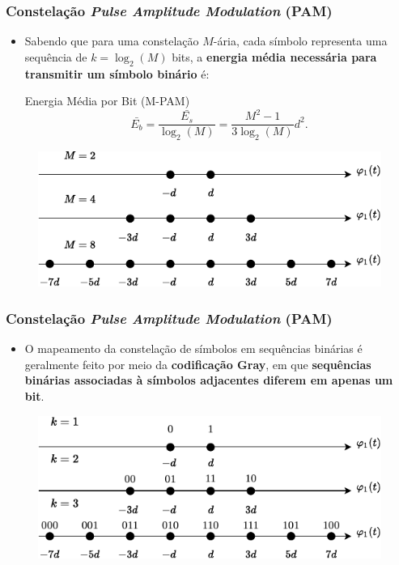 \documentclass{beamer}
\newcommand{\pag}[1] {\begin{frame}#1\end{frame}}
\begin{document}
\pag{
	\frametitle{Constelação \textit{Pulse Amplitude Modulation} (PAM)}
	\begin{itemize}
		\item Sabendo que para uma constelação $M$-ária, cada símbolo representa uma sequência de $k = \log_{2}(M)$ bits, a \textbf{energia média necessária para transmitir um símbolo binário} é:
	\begin{block}{Energia Média por Bit (M-PAM)}
		\begin{equation}
			\bar{E_{b}} = \frac{\bar{E_{s}}}{\log_{2}(M)} = \frac{M^2 - 1}{3\log_{2}(M)}d^2.
		\end{equation}
	\end{block}
	\end{itemize}		
	\begin{figure}[!htb]
		\centering
		\includegraphics[width=0.8\linewidth]{PAM_C1.pdf}
	\end{figure}	
}

\pag{
	\frametitle{Constelação \textit{Pulse Amplitude Modulation} (PAM)}
	\begin{itemize}
		\item O mapeamento da constelação de símbolos em sequências binárias é geralmente feito por meio da \textbf{codificação Gray}, em que \textbf{sequências binárias associadas à símbolos adjacentes diferem em apenas um bit}.
	\end{itemize}
	\begin{figure}[!htb]
		\centering
		\includegraphics[width=0.9\linewidth]{PAM_C2.pdf}
	\end{figure}
}
\end{document}
